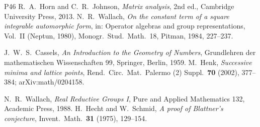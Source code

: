 \documentclass[10pt]{amsart}
\theoremstyle{definition}
\theoremstyle{remark}
\begin{document}
\begin{thebibliography}{P46}
 R.~A.~Horn and C.~R.~Johnson, \emph{Matrix analysis}, 2nd ed., Cambridge University
Press, 2013.
 N.~R.~Wallach, \emph{On the constant term of a square integrable automorphic
form}, in: Operator algebras and group representations, Vol.~II (Neptun, 1980), Monogr.\ Stud.\
Math.~18, Pitman, 1984, 227--237.



 J.~W.~S.~Cassels, \emph{An Introduction to the Geometry of Numbers}, Grundlehren
der mathematischen Wissenschaften 99, Springer, Berlin, 1959.
 M.~Henk, \emph{Successive minima and lattice points}, Rend.\ Circ.\ Mat.\ Palermo (2) Suppl.\ \textbf{70} (2002), 377--384; arXiv:math/0204158.

 N.~R.~Wallach, \emph{Real Reductive Groups I}, Pure and Applied Mathematics 132, Academic Press, 1988.
\bibitem{HechtSchmid75} H.~Hecht and W.~Schmid, \emph{A proof of Blattner's conjecture}, Invent.\ Math.\ \textbf{31} (1975), 129--154.



\end{thebibliography}
\end{document}
